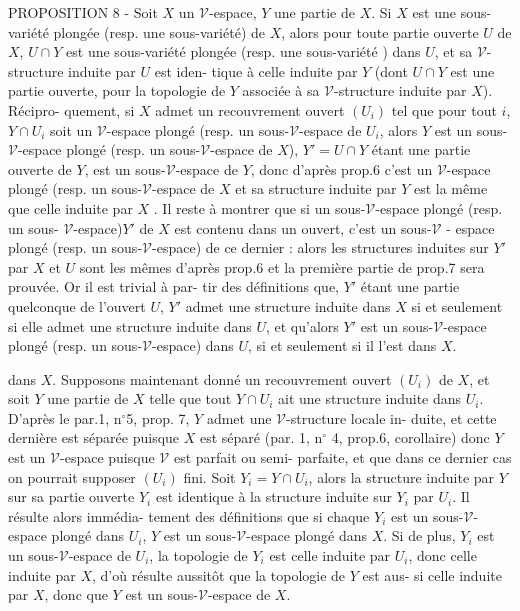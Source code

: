 PROPOSITION 8 - Soit $X$ un $\mathcal{V}$-espace, $Y$ une partie de $X$. Si $X$ est une
sous-variété plongée (resp. une sous-variété) de $X$, alors pour toute
partie ouverte $U$ de $X$, $U \cap Y$ est une sous-variété plongée (resp. une
sous-variété ) dans $U$, et sa $\mathcal{V}$-structure induite par $U$ est iden-
tique à celle induite par $Y$ (dont $U \cap Y$ est une partie ouverte, pour
la topologie de $Y$ associée à sa $\mathcal{V}$-structure induite par $X$). Récipro-
quement, si $X$ admet un recouvrement ouvert $(U_i)$ tel que pour tout $i$,
$Y \cap U_i$ soit un $\mathcal{V}$-espace plongé (resp. un sous-$\mathcal{V}$-espace de $U_i$, alors
$Y$ est un sous-$\mathcal{V}$-espace plongé (resp. un sous-$\mathcal{V}$-espace de $X$),
$Y' = U \cap Y$ étant une partie ouverte de $Y$, est un sous-$\mathcal{V}$-espace de $Y$,
donc d'après prop.6 c'est un $\mathcal{V}$-espace plongé (resp. un sous-$\mathcal{V}$-espace
de $X$ et sa structure induite par $Y$ est la même que celle induite par $X$ .
Il reste à montrer que si un sous-$\mathcal{V}$-espace plongé (resp. un sous-
$\mathcal{V}$-espace)$Y'$ de $X$ est contenu dans un ouvert, c'est un sous-$\mathcal{V}$ -
espace plongé (resp. un sous-$\mathcal{V}$-espace) de ce dernier : alors les
structures induites sur $Y'$ par $X$ et $U$ sont les mêmes d'après prop.6
et la première partie de prop.7 sera prouvée. Or il est trivial à par-
tir des définitions que, $Y'$ étant une partie quelconque de l'ouvert $U$,
$Y'$ admet une structure induite dans $X$ si et seulement si elle admet
une structure induite dans $U$, et qu'alors $Y'$ est un sous-$\mathcal{V}$-espace
plongé (resp. un sous-$\mathcal{V}$-espace) dans $U$, si et seulement si il l'est
dans $X$.

\newpage



dans $X$. Supposons maintenant donné un recouvrement ouvert $(U_i)$ de $X$, et
soit $Y$ une partie de $X$ telle que tout $Y \cap U_i$ ait une structure induite dans
$U_i$. D'après le par.1, n$^\circ$5, prop. 7, $Y$ admet une $\mathcal{V}$-structure locale in-
duite, et cette dernière est séparée puisque $X$ est séparé (par. 1, n$^\circ$ 4,
prop.6, corollaire) donc $Y$ est un $\mathcal{V}$-espace puisque $\mathcal{V}$ est parfait ou semi-
parfaite, et que dans ce dernier cas on pourrait supposer $(U_i)$ fini. Soit
$Y_i = Y \cap U_i$, alors la structure induite par $Y$ sur sa partie ouverte $Y_i$ est
identique à la structure induite sur $Y_i$ par $U_i$. Il résulte alors immédia-
tement des définitions que si chaque $Y_i$ est un sous-$\mathcal{V}$-espace plongé
dans $U_i$, $Y$ est un sous-$\mathcal{V}$-espace plongé dans $X$. Si de plus, $Y_i$ est un
sous-$\mathcal{V}$-espace de $U_i$, la topologie de $Y_i$ est celle induite par $U_i$, donc
celle induite par $X$, d'où résulte aussitôt que la topologie de $Y$ est aus-
si celle induite par $X$, donc que $Y$ est un sous-$\mathcal{V}$-espace de $X$.

